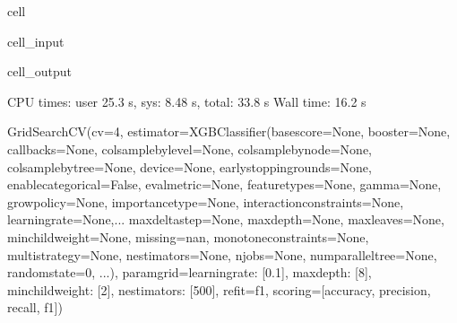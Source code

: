 \documentclass[letterpaper,10pt,english]{sphinxmanual}
\begin{document}
\begin{sphinxuseclass}{cell}
\begin{sphinxuseclass}{cell_input}
\begin{sphinxVerbatim}[commandchars=\\\{\}]
 
\end{sphinxVerbatim}

\end{sphinxuseclass}
\begin{sphinxuseclass}{cell_output}
\begin{sphinxVerbatim}[commandchars=\\\{\}]
CPU times: user 25.3 s, sys: 8.48 s, total: 33.8 s
Wall time: 16.2 s
\end{sphinxVerbatim}

\begin{sphinxVerbatim}[commandchars=\\\{\}]
GridSearchCV(cv=4,
             estimator=XGBClassifier(base\PYGZus{}score=None, booster=None,
                                     callbacks=None, colsample\PYGZus{}bylevel=None,
                                     colsample\PYGZus{}bynode=None,
                                     colsample\PYGZus{}bytree=None, device=None,
                                     early\PYGZus{}stopping\PYGZus{}rounds=None,
                                     enable\PYGZus{}categorical=False, eval\PYGZus{}metric=None,
                                     feature\PYGZus{}types=None, gamma=None,
                                     grow\PYGZus{}policy=None, importance\PYGZus{}type=None,
                                     interaction\PYGZus{}constraints=None,
                                     learning\PYGZus{}rate=None,...
                                     max\PYGZus{}delta\PYGZus{}step=None, max\PYGZus{}depth=None,
                                     max\PYGZus{}leaves=None, min\PYGZus{}child\PYGZus{}weight=None,
                                     missing=nan, monotone\PYGZus{}constraints=None,
                                     multi\PYGZus{}strategy=None, n\PYGZus{}estimators=None,
                                     n\PYGZus{}jobs=None, num\PYGZus{}parallel\PYGZus{}tree=None,
                                     random\PYGZus{}state=0, ...),
             param\PYGZus{}grid=\PYGZob{}\PYGZsq{}learning\PYGZus{}rate\PYGZsq{}: [0.1], \PYGZsq{}max\PYGZus{}depth\PYGZsq{}: [8],
                         \PYGZsq{}min\PYGZus{}child\PYGZus{}weight\PYGZsq{}: [2], \PYGZsq{}n\PYGZus{}estimators\PYGZsq{}: [500]\PYGZcb{},
             refit=\PYGZsq{}f1\PYGZsq{}, scoring=[\PYGZsq{}accuracy\PYGZsq{}, \PYGZsq{}precision\PYGZsq{}, \PYGZsq{}recall\PYGZsq{}, \PYGZsq{}f1\PYGZsq{}])
\end{sphinxVerbatim}

\end{sphinxuseclass}
\end{sphinxuseclass}
\end{document}
